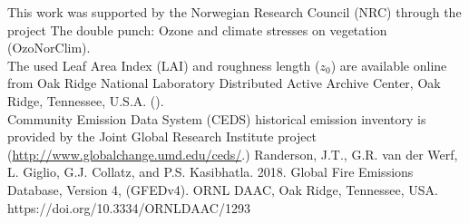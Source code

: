 \documentclass[gmd, manuscript]{copernicus}
\begin{document}
\noappendix       %












\begin{acknowledgements}
  This work was supported by the Norwegian Research Council (NRC) through the project The double punch: Ozone and climate stresses on vegetation (OzoNorClim).\\
  The used Leaf Area Index (LAI) and roughness length ($z_0$) are available online from Oak Ridge National Laboratory Distributed Active Archive Center, Oak Ridge, Tennessee, U.S.A. ().\\
  Community Emission Data System (CEDS) historical emission inventory is provided by the Joint Global Research Institute project (\url{http://www.globalchange.umd.edu/ceds/}.)
  Randerson, J.T., G.R. van der Werf, L. Giglio, G.J. Collatz, and P.S. Kasibhatla. 2018. Global Fire Emissions Database, Version 4, (GFEDv4). ORNL DAAC, Oak Ridge, Tennessee, USA. https://doi.org/10.3334/ORNLDAAC/1293
\end{acknowledgements}
\end{document}
